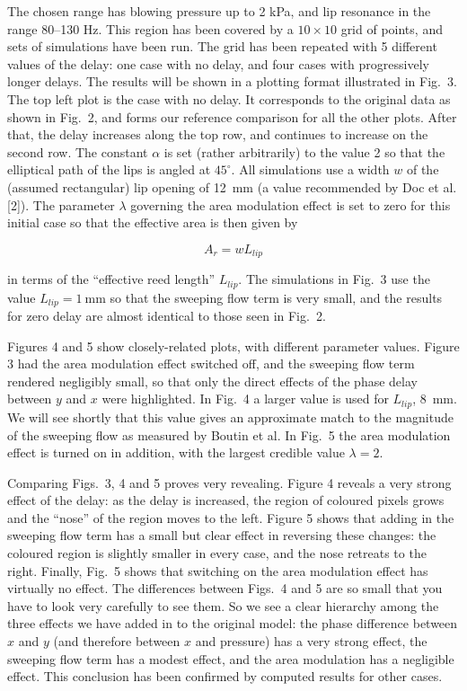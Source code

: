  The chosen range has blowing pressure up to 2 kPa, and lip resonance in the 
  range 80--130 Hz. This region has been covered by a $10 \times 10$ grid of 
  points, and sets of simulations have been run. The grid has been repeated 
  with 5 different values of the delay: one case with no delay, and four cases 
  with progressively longer delays. The results will be shown in a plotting 
  format illustrated in Fig.\ 3. The top left plot is the case with no delay. 
  It corresponds to the original data as shown in Fig.\ 2, and forms our 
  reference comparison for all the other plots. After that, the delay increases 
  along the top row, and continues to increase on the second row. The constant 
  $\alpha$ is set (rather arbitrarily) to the value 2 so that the elliptical 
  path of the lips is angled at $45^\circ$. All simulations use a width $w$ of 
  the (assumed rectangular) lip opening of 12~mm (a value recommended by Doc et 
  al. [2]). The parameter $\lambda$ governing the area modulation effect is set 
  to zero for this initial case so that the effective area is then given by 

  $$A_r=w L_{lip} \tag{5}$$ 

  in terms of the ``effective reed length'' $L_{lip}$. The simulations in Fig.\ 
  3 use the value $L_{lip}=1 \mathrm{~mm}$ so that the sweeping flow term is 
  very small, and the results for zero delay are almost identical to those seen 
  in Fig.\ 2. 

  Figures 4 and 5 show closely-related plots, with different parameter values. 
  Figure 3 had the area modulation effect switched off, and the sweeping flow 
  term rendered negligibly small, so that only the direct effects of the phase 
  delay between $y$ and $x$ were highlighted. In Fig.\ 4 a larger value is used 
  for $L_{lip}$, 8~mm. We will see shortly that this value gives an approximate 
  match to the magnitude of the sweeping flow as measured by Boutin et al. In 
  Fig.\ 5 the area modulation effect is turned on in addition, with the largest 
  credible value $\lambda =2$. 

  Comparing Figs.\ 3, 4 and 5 proves very revealing. Figure 4 reveals a very 
  strong effect of the delay: as the delay is increased, the region of coloured 
  pixels grows and the ``nose'' of the region moves to the left. Figure 5 shows 
  that adding in the sweeping flow term has a small but clear effect in 
  reversing these changes: the coloured region is slightly smaller in every 
  case, and the nose retreats to the right. Finally, Fig.\ 5 shows that 
  switching on the area modulation effect has virtually no effect. The 
  differences between Figs.\ 4 and 5 are so small that you have to look very 
  carefully to see them. So we see a clear hierarchy among the three effects we 
  have added in to the original model: the phase difference between $x$ and $y$ 
  (and therefore between $x$ and pressure) has a very strong effect, the 
  sweeping flow term has a modest effect, and the area modulation has a 
  negligible effect. This conclusion has been confirmed by computed results for 
  other cases. 

